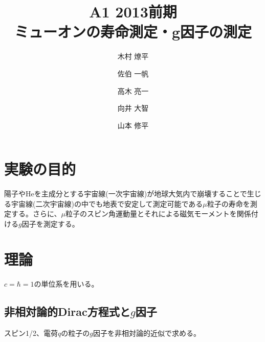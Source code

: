 \documentclass{jsarticle}
\begin{document}
\title{A1 2013前期\\ミューオンの寿命測定・g因子の測定}
\author{木村 燎平 \and 佐伯 一帆 \and 高木 亮一 \and 向井 大智 \and 山本 修平}
\date{}
\maketitle
\thispagestyle{empty}

\section{実験の目的}
陽子やHeを主成分とする宇宙線(一次宇宙線)が地球大気内で崩壊することで生じる宇宙線(二次宇宙線)の中でも地表で安定して測定可能である$\mu$粒子の寿命を測定する。さらに、$\mu$粒子のスピン角運動量とそれによる磁気モーメントを関係付ける$g$因子を測定する。
\section{理論}
$c=\hbar=1$の単位系を用いる。
\subsection{非相対論的Dirac方程式と$g$因子}
スピン1/2、電荷$q$の粒子の$g$因子を非相対論的近似で求める。
\end{document}
